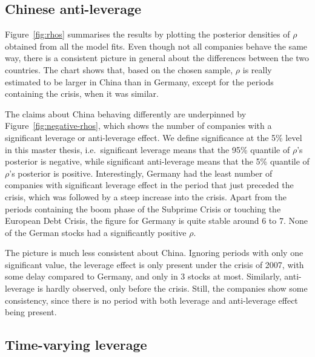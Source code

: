 \subsection{Chinese anti-leverage}

Figure~\ref{fig:rhos} summarises the results by plotting the posterior densities of $\rho$ obtained from all the model fits.
Even though not all companies behave the same way, there is a consistent picture in general about the differences between the two countries.
The chart shows that, based on the chosen sample, $\rho$ is really estimated to be larger in China than in Germany, except for the periods containing the crisis, when it was similar.

The claims about China behaving differently are underpinned by Figure~\ref{fig:negative-rhos}, which shows the number of companies with a significant leverage or anti-leverage effect.
We define significance at the 5\% level in this master thesis, i.e.\ significant leverage means that the 95\% quantile of $\rho$'s posterior is negative, while significant anti-leverage means that the 5\% quantile of $\rho$'s posterior is positive.
Interestingly, Germany had the least number of companies with significant leverage effect in the period that just preceded the crisis, which was followed by a steep increase into the crisis.
Apart from the periods containing the boom phase of the Subprime Crisis or touching the European Debt Crisis, the figure for Germany is quite stable around 6 to 7.
None of the German stocks had a significantly positive $\rho$.

The picture is much less consistent about China.
Ignoring periods with only one significant value, the leverage effect is only present under the crisis of 2007, with some delay compared to Germany, and only in 3 stocks at most.
Similarly, anti-leverage is hardly observed, only before the crisis.
Still, the companies show some consistency, since there is no period with both leverage and anti-leverage effect being present.


\subsection{Time-varying leverage}

